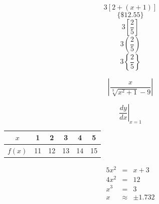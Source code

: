 \documentclass[11pt]{article}
\begin{document}
$$3[2+(x+1)]$$
$$\{\$12.55\}$$
$$3\left[\frac{2}{5}\right]$$
$$3\left(\frac{2}{5}\right)$$
$$3\left\{\frac{2}{5}\right\}$$

$$\left|\frac{x}{\sqrt[3]{x^2+1}-9}\right|$$

$$\left.\frac{dy}{dx}\right| _{x=1}$$

\begin{tabular}{|c|c|c|c|c|c|}

\hline 
$x$  & 1 & 2 & 3 & 4 & 5 \\
\hline
$f(x)$  & 11 & 12 & 13 & 14 & 15\\
\hline

\end{tabular}

\begin{eqnarray*}
5x^2&=&x+3\\
4x^2&=&12\\
x^3&=&3\\
x&\approx&\pm1.732
\end{eqnarray*}
\end{document}

